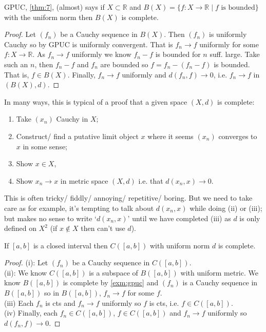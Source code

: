 \begin{example} \label{exm:gpuc}
    GPUC, \cref{thm:7}, (almost) says if $X \subset \mathbb{R}$ and $B(X) = \{f : X \to \mathbb{R} \mid f \text{ is bounded}\}$ with the uniform norm then $B(X)$ is complete.
\end{example} 

\begin{proof}
    Let $(f_n)$ be a Cauchy sequence in $B(X)$.
    Then $(f_n)$ is uniformly Cauchy so by GPUC is uniformly convergent.
    That is $f_n \to f$ uniformly for some $f: X \to \mathbb{R}$.
    As $f_n \to f$ uniformly we know $f_n - f$ is bounded for $n$ suff. large.
    Take such an $n$, then $f_n - f$ and $f_n$ are bounded so $f = f_n - (f_n  - f)$ is bounded.
    That is, $f \in B(X)$.
    Finally, $f_n \to f$ uniformly and $d(f_n, f) \to 0$, i.e. $f_n \to f$ in $(B(X), d)$.
\end{proof} 

\begin{remark}
    In many ways, this is typical of a proof that a given space $(X, d)$ is complete:
    \begin{enumerate}
        \item Take $(x_n)$ Cauchy in $X$;
        \item Construct/ find a putative limit object $x$ where it seems $(x_n)$ converges to $x$ in some sense;
        \item Show $x \in X$,
        \item Show $x_n \to x$ in metric space $(X, d)$ i.e. that $d(x_n, x) \to 0$.
    \end{enumerate} 
    This is often tricky/ fiddly/ annoying/ repetitive/ boring.
    But we need to take care as for example, it's tempting to talk about $d(x_n, x)$ while doing (ii) or (iii); but makes no sense to write `$d(x_n, x)$' until we have completed (iii) as $d$ is only defined on $X^2$ (if $x \notin X$ then can't use $d$).
\end{remark} 

\begin{example}
    If $[a, b]$ is a closed interval then $C([a, b])$ with uniform norm $d$ is complete.
\end{example} 

\begin{proof}
    (i): Let $(f_n)$ be a Cauchy sequence in $C([a, b])$. \\
    (ii): We know $C([a, b])$ is a subspace of $B([a, b])$ with uniform metric.
    We know $B([a, b])$ is complete by \cref{exm:gpuc} and $(f_n)$ is a Cauchy sequence in $B([a, b])$ so in $B([a, b])$, $f_n \to f$ for some $f$. \\
    (iii) Each $f_n$ is cts and $f_n \to f$ uniformly so $f$ is cts, i.e. $f \in C([a, b])$. \\
    (iv) Finally, each $f_n \in C([a, b])$, $f \in C([a, b])$ and $f_n \to f$ uniformly so $d(f_n, f) \to 0$.
\end{proof} 

